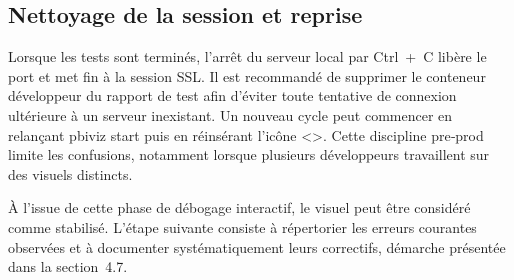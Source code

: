 \subsection{Nettoyage de la session et reprise}

Lorsque les tests sont terminés, l’arrêt du serveur local par Ctrl + C libère le port et met fin à la session SSL. Il est recommandé de supprimer le conteneur développeur du rapport de test afin d’éviter toute tentative de connexion ultérieure à un serveur inexistant. Un nouveau cycle peut commencer en relançant pbiviz start puis en réinsérant l’icône <>. Cette discipline pre‑prod limite les confusions, notamment lorsque plusieurs développeurs travaillent sur des visuels distincts.



À l’issue de cette phase de débogage interactif, le visuel peut être considéré comme stabilisé. L’étape suivante consiste à répertorier les erreurs courantes observées et à documenter systématiquement leurs correctifs, démarche présentée dans la section 4.7.

